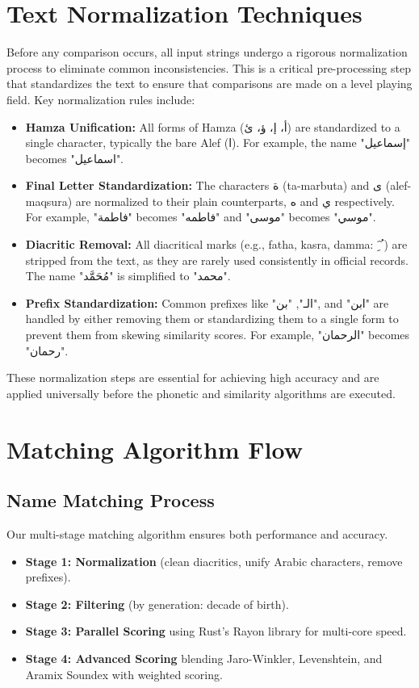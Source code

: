 \section{Text Normalization Techniques}
Before any comparison occurs, all input strings undergo a rigorous normalization process to eliminate common inconsistencies. This is a critical pre-processing step that standardizes the text to ensure that comparisons are made on a level playing field. Key normalization rules include:
\begin{itemize}
    \item \textbf{Hamza Unification:} All forms of Hamza (\textarabic{أ، إ، ؤ، ئ}) are standardized to a single character, typically the bare Alef (\textarabic{ا}). For example, the name "\textarabic{إسماعيل}" becomes "\textarabic{اسماعيل}".
    \item \textbf{Final Letter Standardization:} The characters \textarabic{ة} (ta-marbuta) and \textarabic{ى} (alef-maqsura) are normalized to their plain counterparts, \textarabic{ه} and \textarabic{ي} respectively. For example, "\textarabic{فاطمة}" becomes "\textarabic{فاطمه}" and "\textarabic{موسى}" becomes "\textarabic{موسي}".
    \item \textbf{Diacritic Removal:} All diacritical marks (e.g., fatha, kasra, damma: \textarabic{َ ِ ُ}) are stripped from the text, as they are rarely used consistently in official records. The name "\textarabic{مُحَمَّد}" is simplified to "\textarabic{محمد}".
    \item \textbf{Prefix Standardization:} Common prefixes like "\textarabic{الـ}", "\textarabic{بن}", and "\textarabic{ابن}" are handled by either removing them or standardizing them to a single form to prevent them from skewing similarity scores. For example, "\textarabic{الرحمان}" becomes "\textarabic{رحمان}".
\end{itemize}
These normalization steps are essential for achieving high accuracy and are applied universally before the phonetic and similarity algorithms are executed.

\section{Matching Algorithm Flow}

\subsection{Name Matching Process}
Our multi-stage matching algorithm ensures both performance and accuracy.
\begin{itemize}
    \item \textbf{Stage 1: Normalization} (clean diacritics, unify Arabic characters, remove prefixes).
    \item \textbf{Stage 2: Filtering} (by generation: decade of birth).
    \item \textbf{Stage 3: Parallel Scoring} using Rust’s Rayon library for multi-core speed.
    \item \textbf{Stage 4: Advanced Scoring} blending Jaro-Winkler, Levenshtein, and Aramix Soundex with weighted scoring.
\end{itemize}

